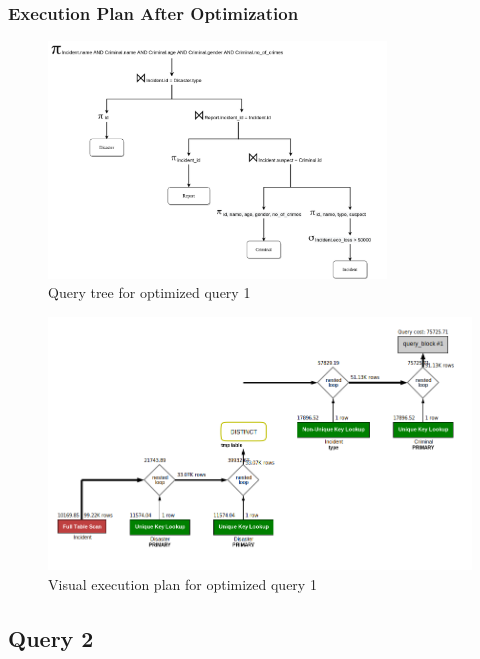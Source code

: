 \subsubsection{Execution Plan After Optimization}
\begin{figure}[H]
    \centering
    \includegraphics[width=0.8\textwidth]{images/query_trees/query1-optimized.png}
    \caption{Query tree for optimized query 1}
\end{figure}
\begin{figure}[H]
    \centering
    \includegraphics[width=\textwidth]{images/execution_plans/q1-3-new.png}
    \caption{Visual execution plan for optimized query 1}
\end{figure}

\subsection{Query 2}

